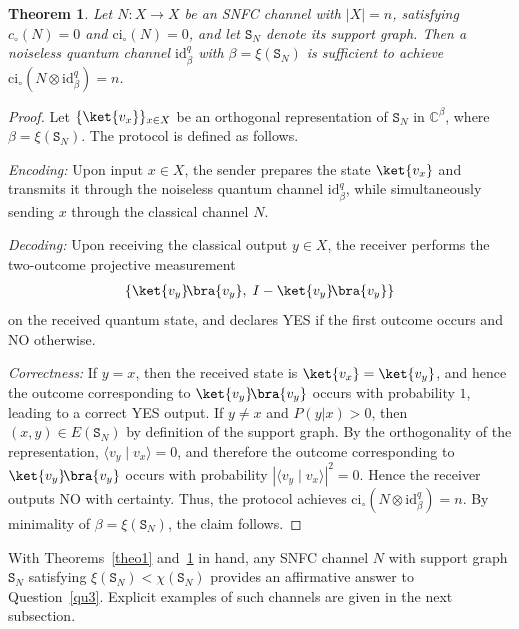 \documentclass[12pt,a4paper]{article}
\newtheorem{theorem}{Theorem}
\begin{document}
\begin{theorem}\label{theo4}
Let $N : X \to X$ be an SNFC channel with $|X| = n$, satisfying $c_\circ(N)=0$ and $\mathrm{ci}_\circ(N)=0$, and let $\mathtt{S}_N$ denote its support graph. Then a noiseless quantum channel $\mathrm{id}^q_{\beta}$ with $\beta = \xi(\mathtt{S}_N)$ is sufficient to achieve $\mathrm{ci}_\circ\!\left(N \otimes \mathrm{id}^q_{\beta}\right) = n$. 
\end{theorem}
\begin{proof}
Let $\{ \ket{v_x} \}_{x \in X}$ be an orthogonal representation of $\mathtt{S}_N$ in $\mathbb{C}^{\beta}$, where $\beta = \xi(\mathtt{S}_N)$. The protocol is defined as follows.

\noindent \emph{Encoding:} Upon input $x \in X$, the sender prepares the state $\ket{v_x}$ and transmits it through the noiseless quantum channel $\mathrm{id}^q_{\beta}$, while simultaneously sending $x$ through the classical channel $N$.

\noindent \emph{Decoding:} Upon receiving the classical output $y \in X$, the receiver performs the two-outcome projective measurement
\begin{align*}
\left\{ \ket{v_y}\!\bra{v_y},\; I - \ket{v_y}\!\bra{v_y} \right\}   
\end{align*}
on the received quantum state, and declares YES if the first outcome occurs and NO otherwise.

\noindent\emph{Correctness:} If $y = x$, then the received state is $\ket{v_x} = \ket{v_y}$, and hence the outcome corresponding to $\ket{v_y}\!\bra{v_y}$ occurs with probability $1$, leading to a correct YES output. If $y \neq x$ and $P(y|x) > 0$, then $(x,y) \in E(\mathtt{S}_N)$ by definition of the support graph. By the orthogonality of the representation, $\langle v_y \mid v_x \rangle = 0$, and therefore the outcome corresponding to $\ket{v_y}\!\bra{v_y}$ occurs with probability $|\langle v_y \mid v_x \rangle|^2 = 0$. Hence the receiver outputs NO with certainty. Thus, the protocol achieves $\mathrm{ci}_\circ(N \otimes \mathrm{id}^q_{\beta}) = n$. By minimality of $\beta = \xi(\mathtt{S}_N)$, the claim follows.
\end{proof}

\noindent With Theorems~\ref{theo1} and~\ref{theo4} in hand, any SNFC channel $N$ with support graph $\mathtt{S}_N$ satisfying $\xi(\mathtt{S}_N) < \chi(\mathtt{S}_N)$ provides an affirmative answer to Question~\ref{qu3}. Explicit examples of such channels are given in the next subsection.  
\end{document}

